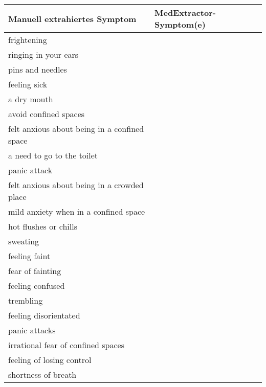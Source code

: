 \begin{table}[H]
\begin{center}
\begin{tabular}{ll}
\toprule
                      Manuell extrahiertes Symptom &       MedExtractor-Symptom(e) \\
\midrule
                                 frightening &               \\
                        ringing in your ears &               \\
                            pins and needles &               \\
                                feeling sick &               \\
                                 a dry mouth &               \\
                       avoid confined spaces &               \\
felt anxious about being in a confined space &               \\
                  a need to go to the toilet &               \\
                                panic attack &               \\
 felt anxious about being in a crowded place &               \\
       mild anxiety when in a confined space &               \\
                       hot flushes or chills &               \\
                                    sweating &               \\
                               feeling faint &               \\
                            fear of fainting &               \\
                            feeling confused &               \\
                                   trembling &               \\
                       feeling disorientated &               \\
                               panic attacks &               \\
          irrational fear of confined spaces &               \\
                   feeling of losing control &               \\
                         shortness of breath &               \\

\end{tabular}
\end{center}
\end{table}

